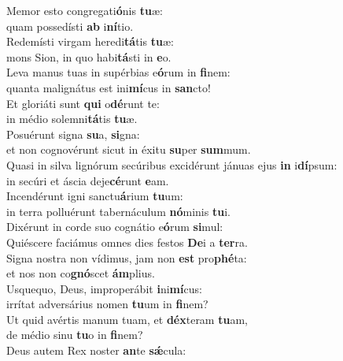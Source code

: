\evenverse Memor esto congregati\textbf{ó}nis \textbf{tu}æ:~\*\\
\evenverse quam possedísti \textbf{ab} i\textbf{ní}tio.\\
\oddverse Redemísti virgam heredi\textbf{tá}tis \textbf{tu}æ:~\*\\
\oddverse mons Sion, in quo habi\textbf{tá}sti in \textbf{e}o.\\
\evenverse Leva manus tuas in supérbias e\textbf{ó}rum in \textbf{fi}nem:~\*\\
\evenverse quanta malignátus est ini\textbf{mí}cus in \textbf{san}cto!\\
\oddverse Et gloriáti sunt \textbf{qui} o\textbf{dé}runt te:~\*\\
\oddverse in médio solemni\textbf{tá}tis \textbf{tu}æ.\\
\evenverse Posuérunt signa \textbf{su}a, \textbf{si}gna:~\*\\
\evenverse et non cognovérunt sicut in éxitu \textbf{su}per \textbf{sum}mum.\\
\oddverse Quasi in silva lignórum secúribus excidérunt jánuas ejus \textbf{in} i\textbf{dí}psum:~\*\\
\oddverse in secúri et áscia deje\textbf{cé}runt \textbf{e}am.\\
\evenverse Incendérunt igni sanctu\textbf{á}rium \textbf{tu}um:~\*\\
\evenverse in terra polluérunt tabernáculum \textbf{nó}minis \textbf{tu}i.\\
\oddverse Dixérunt in corde suo cognátio e\textbf{ó}rum \textbf{si}mul:~\*\\
\oddverse Quiéscere faciámus omnes dies festos \textbf{De}i a \textbf{ter}ra.\\
\evenverse Signa nostra non vídimus, jam non \textbf{est} pro\textbf{phé}ta:~\*\\
\evenverse et nos non co\textbf{gnó}scet \textbf{ám}plius.\\
\oddverse Usquequo, Deus, improperábit \textbf{i}ni\textbf{mí}cus:~\*\\
\oddverse irrítat adversárius nomen \textbf{tu}um in \textbf{fi}nem?\\
\evenverse Ut quid avértis manum tuam, et \textbf{déx}teram \textbf{tu}am,~\*\\
\evenverse de médio sinu \textbf{tu}o in \textbf{fi}nem?\\
\oddverse Deus autem Rex noster \textbf{an}te \textbf{sǽ}cula:~\*\\
